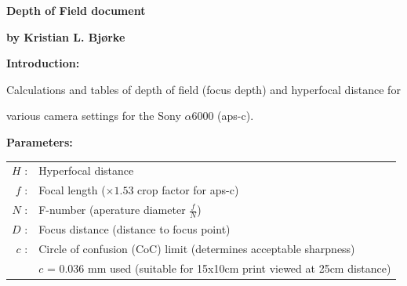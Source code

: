 \documentclass[aspectratio=169]{beamer}
\begin{document}

\begin{frame}[plain]{}
  \vspace{3ex}
  \begin{center} \Huge \bf
    Depth of Field document
  \end{center}
  \begin{center} \Large \bf
    by Kristian L. Bjørke
  \end{center}

  {\large \bf
    Introduction:
  }

  \hspace{2em}Calculations and tables of depth of field (focus depth) and hyperfocal distance for

  \hspace{2em}various camera settings for the Sony $\alpha$\hspace{0.1em}6000 (aps-c).
  

  {\large \bf
    Parameters:
  }

  {
    \small
    \begin{table}
      \centering
      \begin{tabular}{r l}
        $H$ : & Hyperfocal distance \\
        $f$ : & Focal length ($\times 1.53$ crop factor for aps-c) \\
        $N$ : & F-number (aperature diameter $\frac{f}{N}$) \\
        $D$ : & Focus distance (distance to focus point) \\ 
        $c$ : & Circle of confusion (CoC) limit (determines acceptable sharpness) \\
        \ & $c$ = 0.036 mm used (suitable for 15x10cm print viewed at 25cm distance)
      \end{tabular}
    \end{table}
  }
\end{frame}

\end{document}
